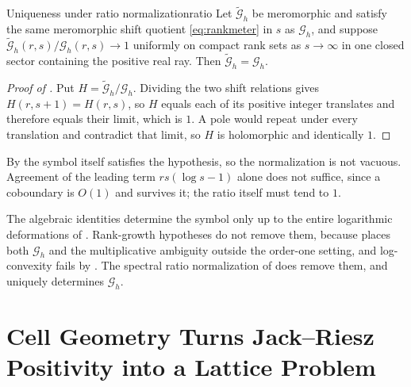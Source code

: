 \documentclass[11pt,letterpaper]{article}
\newcommand{\Gc}{\mathcal{G}}               %
\begin{document}
\begin{boxedcorollary}{Uniqueness under ratio normalization}{ratio}
Let $\widetilde{\Gc}_h$ be meromorphic and satisfy the same meromorphic shift
quotient \eqref{eq:rankmeter} in $s$ as $\Gc_h$, and suppose
$\widetilde{\Gc}_h(r,s)/\Gc_h(r,s)\to1$ uniformly on compact rank sets as
$s\to\infty$ in one closed sector containing the positive real ray. Then
$\widetilde{\Gc}_h=\Gc_h$.
\end{boxedcorollary}

\begin{proof}[Proof of ]
Put $H=\widetilde{\Gc}_h/\Gc_h$. Dividing the two shift relations gives
$H(r,s+1)=H(r,s)$, so $H$ equals each of its positive integer translates and
therefore equals their limit, which is $1$. A pole would repeat under every
translation and contradict that limit, so $H$ is holomorphic and identically $1$.
\end{proof}

By  the symbol itself satisfies the hypothesis, so the
normalization is not vacuous. Agreement of the leading term $rs(\log s-1)$ alone
does not suffice, since a coboundary is $O(1)$ and survives it; the ratio itself
must tend to $1$.

The algebraic identities determine the symbol only up to the entire logarithmic
deformations of . Rank-growth hypotheses do not remove them,
because  places both $\Gc_h$ and the multiplicative ambiguity
outside the order-one setting, and log-convexity fails by .
The spectral ratio normalization of  does remove them, and
uniquely determines $\Gc_h$.

\clearpage
\begin{center}
\end{center}
\esrule

\section{Cell Geometry Turns Jack--Riesz Positivity into a Lattice Problem}
\label{sec:wallach}
\end{document}
